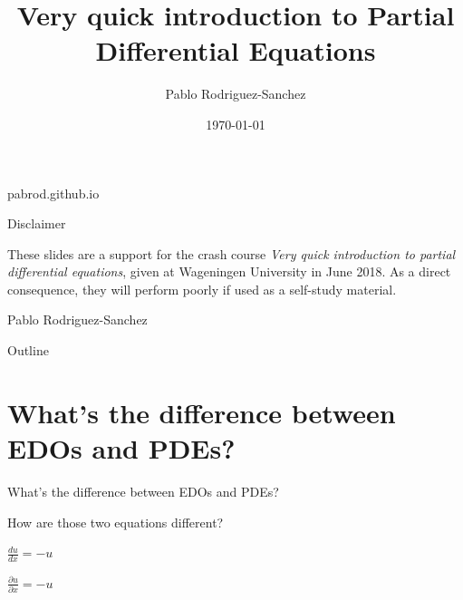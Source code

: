 \documentclass{beamer}
\title{Very quick introduction to Partial Differential Equations}
\author{Pablo Rodriguez-Sanchez}
\institute{Wageningen University and Research}
\date{\today}
\begin{document}
\begin{frame}
  \titlepage
  
  \begin{center}
  \end{center}
  
  \begin{center}
  pabrod.github.io
  \end{center}
  
\end{frame}

\begin{frame}{Disclaimer}

These slides are a support for the crash course \textit{Very quick introduction to partial differential equations}, given at Wageningen University in June 2018. As a direct consequence, they will perform poorly if used as a self-study material.

\begin{flushright}
Pablo Rodriguez-Sanchez
\end{flushright}

\end{frame}

\begin{frame}{Outline}
 \tableofcontents
\end{frame}

\section{What's the difference between EDOs and PDEs?}

  \begin{frame}{What's the difference between EDOs and PDEs?}

    How are those two equations different?

    \begin{center}
    $\frac{du}{dx} = -u$
    \end{center}

    \begin{center}
    $\frac{\partial u}{\partial x} = -u$
    \end{center}

  \end{frame}
\end{document}
